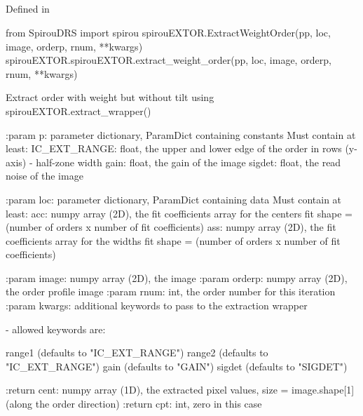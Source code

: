
\begin{minipage}{\textwidth}
\subsection{}

Defined in \spirouEXTOR{}

\begin{pythonbox}
from SpirouDRS import spirou
spirouEXTOR.ExtractWeightOrder(pp, loc, image, orderp, rnum, **kwargs)
spirouEXTOR.spirouEXTOR.extract_weight_order(pp, loc, image, orderp, rnum, **kwargs)
\end{pythonbox}

\begin{pythondocstring}
Extract order with weight but without tilt using
spirouEXTOR.extract_wrapper()

:param p: parameter dictionary, ParamDict containing constants
    Must contain at least:
            IC_EXT_RANGE: float, the upper and lower edge of the order
                          in rows (y-axis) - half-zone width
            gain: float, the gain of the image
            sigdet: float, the read noise of the image

:param loc: parameter dictionary, ParamDict containing data
        Must contain at least:
            acc: numpy array (2D), the fit coefficients array for
                  the centers fit
                  shape = (number of orders x number of fit coefficients)
            ass: numpy array (2D), the fit coefficients array for
                  the widths fit
                  shape = (number of orders x number of fit coefficients)

:param image: numpy array (2D), the image
:param orderp: numpy array (2D), the order profile image
:param rnum: int, the order number for this iteration
:param kwargs: additional keywords to pass to the extraction wrapper

        - allowed keywords are:

        range1  (defaults to "IC_EXT_RANGE")
        range2  (defaults to "IC_EXT_RANGE")
        gain    (defaults to "GAIN")
        sigdet  (defaults to "SIGDET")

:return cent: numpy array (1D), the extracted pixel values,
             size = image.shape[1] (along the order direction)
:return cpt: int, zero in this case
\end{pythondocstring}
\end{minipage}


